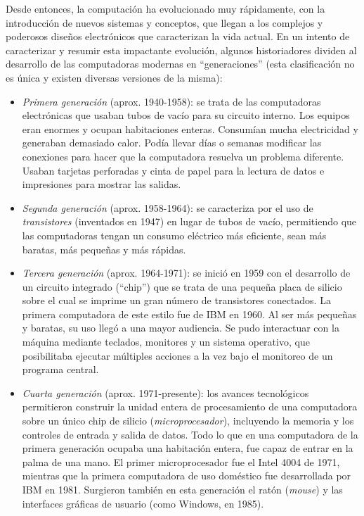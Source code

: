 \documentclass[
]{book}
\providecommand{\tightlist}{%
  \setlength{\itemsep}{0pt}\setlength{\parskip}{0pt}}
\begin{document}
Desde entonces, la computación ha evolucionado muy rápidamente, con la introducción de nuevos sistemas y conceptos, que llegan a los complejos y poderosos diseños electrónicos que caracterizan la vida actual. En un intento de caracterizar y resumir esta impactante evolución, algunos historiadores dividen al desarrollo de las computadoras modernas en ``generaciones'' (esta clasificación no es única y existen diversas versiones de la misma):

\begin{itemize}
\tightlist
\item
  \emph{Primera generación} (aprox. 1940-1958): se trata de las computadoras electrónicas que usaban tubos de vacío para su circuito interno. Los equipos eran enormes y ocupan habitaciones enteras. Consumían mucha electricidad y generaban demasiado calor. Podía llevar días o semanas modificar las conexiones para hacer que la computadora resuelva un problema diferente. Usaban tarjetas perforadas y cinta de papel para la lectura de datos e impresiones para mostrar las salidas.
\item
  \emph{Segunda generación} (aprox. 1958-1964): se caracteriza por el uso de \emph{transistores} (inventados en 1947) en lugar de tubos de vacío, permitiendo que las computadoras tengan un consumo eléctrico más eficiente, sean más baratas, más pequeñas y más rápidas.
\item
  \emph{Tercera generación} (aprox. 1964-1971): se inició en 1959 con el desarrollo de un circuito integrado (``chip'') que se trata de una pequeña placa de silicio sobre el cual se imprime un gran número de transistores conectados. La primera computadora de este estilo fue de IBM en 1960. Al ser más pequeñas y baratas, su uso llegó a una mayor audiencia. Se pudo interactuar con la máquina mediante teclados, monitores y un sistema operativo, que posibilitaba ejecutar múltiples acciones a la vez bajo el monitoreo de un programa central.
\item
  \emph{Cuarta generación} (aprox. 1971-presente): los avances tecnológicos permitieron construir la unidad entera de procesamiento de una computadora sobre un único chip de silicio (\emph{microprocesador}), incluyendo la memoria y los controles de entrada y salida de datos. Todo lo que en una computadora de la primera generación ocupaba una habitación entera, fue capaz de entrar en la palma de una mano. El primer microprocesador fue el Intel 4004 de 1971, mientras que la primera computadora de uso doméstico fue desarrollada por IBM en 1981. Surgieron también en esta generación el ratón (\emph{mouse}) y las interfaces gráficas de usuario (como Windows, en 1985).
\end{itemize}
\end{document}
